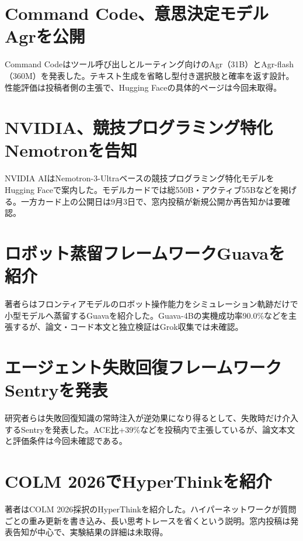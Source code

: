 \section{Command Code、意思決定モデルAgrを公開}
Command Codeはツール呼び出しとルーティング向けのAgr（31B）とAgr-flash（360M）を発表した。テキスト生成を省略し型付き選択肢と確率を返す設計。性能評価は投稿者側の主張で、Hugging Faceの具体的ページは今回未取得。

\section{NVIDIA、競技プログラミング特化Nemotronを告知}
NVIDIA AIはNemotron-3-Ultraベースの競技プログラミング特化モデルをHugging Faceで案内した。モデルカードでは総550B・アクティブ55Bなどを掲げる。一方カード上の公開日は9月3日で、窓内投稿が新規公開か再告知かは要確認。

\section{ロボット蒸留フレームワークGuavaを紹介}
著者らはフロンティアモデルのロボット操作能力をシミュレーション軌跡だけで小型モデルへ蒸留するGuavaを紹介した。Guava-4Bの実機成功率90.0\%などを主張するが、論文・コード本文と独立検証はGrok収集では未確認。

\section{エージェント失敗回復フレームワークSentryを発表}
研究者らは失敗回復知識の常時注入が逆効果になり得るとして、失敗時だけ介入するSentryを発表した。ACE比+39\%などを投稿内で主張しているが、論文本文と評価条件は今回未確認である。

\section{COLM 2026でHyperThinkを紹介}
著者はCOLM 2026採択のHyperThinkを紹介した。ハイパーネットワークが質問ごとの重み更新を書き込み、長い思考トレースを省くという説明。窓内投稿は発表告知が中心で、実験結果の詳細は未取得。

